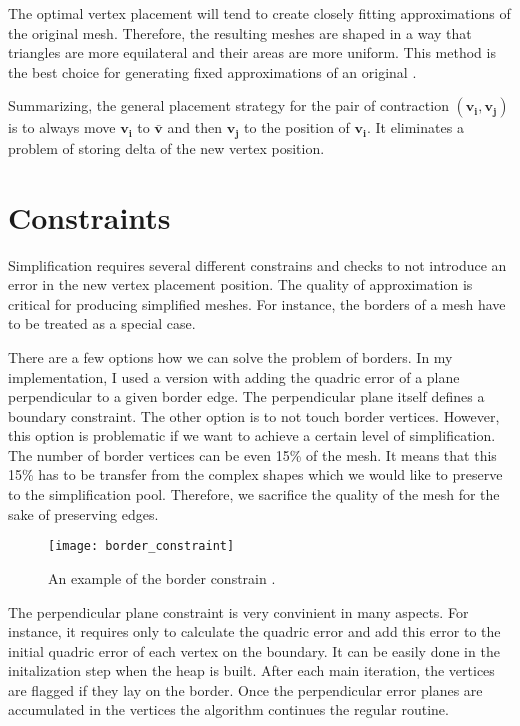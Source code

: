 The optimal vertex placement will tend to create closely fitting approximations of the original mesh. Therefore, the resulting meshes are shaped in a way that triangles are more equilateral and their areas are more uniform. This method is the best choice for generating fixed approximations of an original \cite{garland99}. 

Summarizing, the general placement strategy for the pair of contraction $(\mathbf{v_i}, \mathbf{v_j})$ is to always move $\mathbf{v_i}$ to $\mathbf{\bar{v}}$ and then $\mathbf{v_j}$ to the position of $\mathbf{v_i}$. It eliminates a problem of storing delta of the new vertex position.

\newpage
\section{Constraints}

Simplification requires several different constrains and checks to not introduce an error in the new vertex placement position. The quality of approximation is critical for producing simplified meshes. For instance, the borders of a mesh have to be treated as a special case.

There are a few options how we can solve the problem of borders. In my implementation, I used a version with adding the quadric error of a plane perpendicular to a given border edge. The perpendicular plane itself defines a boundary constraint. The other option is to not touch border vertices. However, this option is problematic if we want to achieve a certain level of simplification. The number of border vertices can be even 15\% of the mesh. It means that this 15\% has to be transfer from the complex shapes which we would like to preserve to the simplification pool. Therefore, we sacrifice the quality of the mesh for the sake of preserving edges.

\begin{figure}[h!]
  \begin{center}
    \texttt{[image: border\_constraint]}
    \caption{An example of the border constrain \cite{garland99}.}
    \label{fig:border_constraint}
  \end{center}
\end{figure}

The perpendicular plane constraint is very convinient in many aspects. For instance, it requires only to calculate the quadric error and add this error to the initial quadric error of each vertex on the boundary. It can be easily done in the initalization step when the heap is built. After each main iteration, the vertices are flagged if they lay on the border. Once the perpendicular error planes are accumulated in the vertices the algorithm continues the regular routine.

